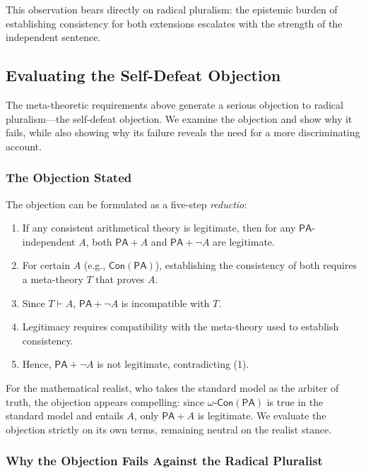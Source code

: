 \documentclass[a4paper,12pt]{amsart}
\theoremstyle{definition}
\numberwithin{equation}{section}
\begin{document}
This observation bears directly on radical pluralism: the epistemic burden of establishing consistency for both extensions escalates with the strength of the independent sentence.
  

\subsection{Evaluating the Self-Defeat Objection}

The meta-theoretic requirements above generate a serious objection to radical pluralism---the self-defeat objection. We examine the objection and show why it fails, while also showing why its failure reveals the need for a more discriminating account.

            
\subsubsection{The Objection Stated}
The objection can be formulated as a five-step \emph{reductio}:
\begin{enumerate}[(1)]
\item If any consistent arithmetical theory is legitimate, then for any \(\mathsf{PA}\)-independent \(A\), both \(\mathsf{PA}+A\) and \(\mathsf{PA}+\neg A\) are legitimate.  
\item For certain \(A\) (e.g., \(\mathsf{Con(PA)}\)), establishing the consistency of both requires a meta-theory \(T\) that proves \(A\).
\item Since \(T\vdash A\), \(\mathsf{PA}+\neg A\) is incompatible with \(T\). 
\item Legitimacy requires compatibility with the meta-theory used to establish consistency.
\item Hence, \(\mathsf{PA}+\neg A\) is not legitimate, contradicting (1).  
\end{enumerate}

For the mathematical realist, who takes the standard model as the 
arbiter of truth, the objection appears compelling: since 
\(\omega\)-\(\mathsf{Con(PA)}\) is true in the standard model and entails $A$, only 
$\mathsf{PA}+A$ is legitimate. We evaluate the objection strictly on 
its own terms, remaining neutral on the realist stance.
   
\subsubsection{Why the Objection Fails Against the Radical Pluralist}
\end{document}
